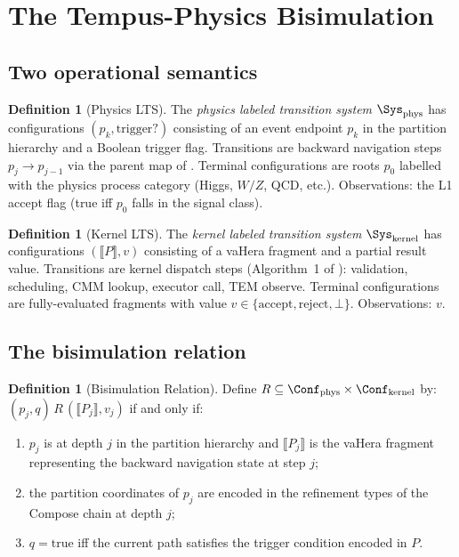 \documentclass[twocolumn,10pt,a4paper]{article}
\theoremstyle{thmstyle}
\theoremstyle{definition}
\newtheorem{definition}[theorem]{Definition}
\theoremstyle{remark}
\begin{document}
\section{The Tempus-Physics Bisimulation}
\label{sec:bisimulation}

\subsection{Two operational semantics}

\begin{definition}[Physics LTS]
\label{def:physics_lts}
The \emph{physics labeled transition system} $\Sys_{\mathrm{phys}}$
has configurations $(p_k, \mathrm{trigger?})$ consisting of an event
endpoint $p_k$ in the partition hierarchy and a Boolean trigger flag.
Transitions are backward navigation steps $p_j \to p_{j-1}$ via the parent
map of \citet{companion:trajectory}. Terminal configurations are roots
$p_0$ labelled with the physics process category (Higgs, $W/Z$, QCD, etc.).
Observations: the L1 accept flag (true iff $p_0$ falls in the signal class).
\end{definition}

\begin{definition}[Kernel LTS]
\label{def:kernel_lts}
The \emph{kernel labeled transition system} $\Sys_{\mathrm{kernel}}$
has configurations $(\llbracket P \rrbracket, v)$ consisting of a vaHera
fragment and a partial result value. Transitions are kernel dispatch steps
(Algorithm~1 of \citealt{companion:kernel}):
validation, scheduling, CMM lookup, executor call, TEM observe.
Terminal configurations are fully-evaluated fragments with value
$v \in \{\mathrm{accept}, \mathrm{reject}, \bot\}$.
Observations: $v$.
\end{definition}

\subsection{The bisimulation relation}

\begin{definition}[Bisimulation Relation]
\label{def:bisim_relation}
Define $R \subseteq \Conf_{\mathrm{phys}} \times \Conf_{\mathrm{kernel}}$ by:
$(p_j, q) \, R \, (\llbracket P_j \rrbracket, v_j)$
if and only if:
\begin{enumerate}[nosep,label=(\roman*)]
\item $p_j$ is at depth $j$ in the partition hierarchy and
  $\llbracket P_j \rrbracket$ is the vaHera fragment representing
  the backward navigation state at step $j$;
\item the partition coordinates of $p_j$ are encoded in the
  refinement types of the Compose chain at depth $j$;
\item $q = \mathrm{true}$ iff the current path satisfies the trigger
  condition encoded in $P$.
\end{enumerate}
\end{definition}
\end{document}
